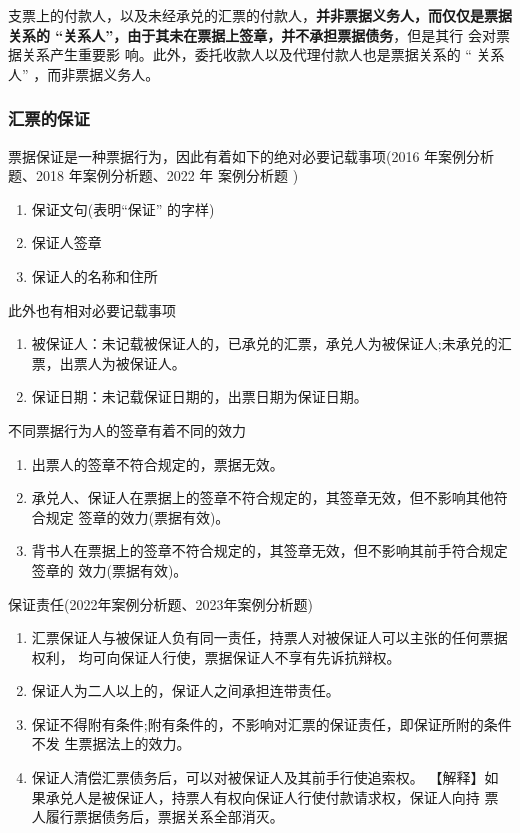 \documentclass[UTF8,12pt]{ctexart}
\numberwithin{equation}{section} %
\numberwithin{figure}{section}
\numberwithin{table}{section}
\begin{document}
	支票上的付款人，以及未经承兑的汇票的付款人，\textbf{并非票据义务人，而仅仅是票据关系的 “关系人”，由于其未在票据上签章，并不承担票据债务}，但是其行 会对票据关系产生重要影 响。此外，委托收款人以及代理付款人也是票据关系的 “ 关系人” ，而非票据义务人。
	
	
	
	\subsubsection{汇票的保证} 
	票据保证是一种票据行为，因此有着如下的绝对必要记载事项(2016 年案例分析题、2018 年案例分析题、2022 年 案例分析题 )
	\begin{enumerate}
		\item 保证文句(表明“保证” 的字样)
		
		\item 保证人签章
		
		\item 保证人的名称和住所
	\end{enumerate}

	此外也有相对必要记载事项
	\begin{enumerate}
		\item 被保证人：未记载被保证人的，已承兑的汇票，承兑人为被保证人;未承兑的汇票，出票人为被保证人。 
		
		\item 保证日期：未记载保证日期的，出票日期为保证日期。
	\end{enumerate}
	
	
	 不同票据行为人的签章有着不同的效力
	 \begin{enumerate}
	 	\item 出票人的签章不符合规定的，票据无效。 
	 	
	 	\item 承兑人、保证人在票据上的签章不符合规定的，其签章无效，但不影响其他符合规定 签章的效力(票据有效)。 
	 
	 	\item 背书人在票据上的签章不符合规定的，其签章无效，但不影响其前手符合规定签章的 效力(票据有效)。
	\end{enumerate}
	 
	 
	保证责任(2022年案例分析题、2023年案例分析题) 
	\begin{enumerate}
	 	\item 汇票保证人与被保证人负有同一责任，持票人对被保证人可以主张的任何票据权利， 均可向保证人行使，票据保证人不享有先诉抗辩权。
	 	
	 	\item 保证人为二人以上的，保证人之间承担连带责任。
	 	
	 	\item 保证不得附有条件;附有条件的，不影响对汇票的保证责任，即保证所附的条件不发 生票据法上的效力。
	 	
	 	\item 保证人清偿汇票债务后，可以对被保证人及其前手行使追索权。 【解释】如果承兑人是被保证人，持票人有权向保证人行使付款请求权，保证人向持 票人履行票据债务后，票据关系全部消灭。
	 	
	\end{enumerate}
	
\end{document}
